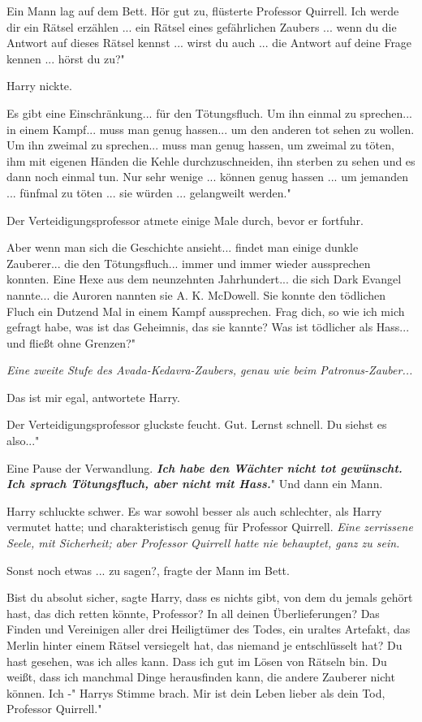 Ein Mann lag auf dem Bett. \glqq{}Hör gut zu\grqq{}, flüsterte Professor
Quirrell. \glqq{}Ich werde dir ein Rätsel erzählen ... ein Rätsel eines
gefährlichen Zaubers ... wenn du die Antwort auf dieses Rätsel kennst ... wirst
du auch ... die Antwort auf deine Frage kennen ... hörst du zu?"

Harry nickte.

\glqq{}Es gibt eine Einschränkung... für den Tötungsfluch. Um ihn einmal zu
sprechen... in einem Kampf... muss man genug hassen... um den anderen tot sehen
zu wollen. Um ihn zweimal zu sprechen... muss man genug hassen, um zweimal zu
töten, ihm mit eigenen Händen die Kehle durchzuschneiden, ihn sterben zu sehen
und es dann noch einmal tun. Nur sehr wenige ... können genug hassen ... um
jemanden ... fünfmal zu töten ... sie würden ... gelangweilt werden."

Der Verteidigungsprofessor atmete einige Male durch, bevor er fortfuhr.

\glqq{}Aber wenn man sich die Geschichte ansieht... findet man einige dunkle
Zauberer... die den Tötungsfluch... immer und immer wieder aussprechen konnten.
Eine Hexe aus dem neunzehnten Jahrhundert... die sich Dark Evangel nannte... die
Auroren nannten sie A. K. McDowell. Sie konnte den tödlichen Fluch ein Dutzend
Mal in einem Kampf aussprechen. Frag dich, so wie ich mich gefragt habe, was ist
das Geheimnis, das sie kannte? Was ist tödlicher als Hass... und fließt ohne
Grenzen?"

\emph{Eine zweite Stufe des Avada-Kedavra-Zaubers, genau wie beim
Patronus-Zauber...}

\glqq{}Das ist mir egal\grqq{}, antwortete Harry.

Der Verteidigungsprofessor gluckste feucht. \glqq{}Gut. Lernst schnell. Du siehst
es also..."

Eine Pause der Verwandlung. \glqq{}\textbf{\emph{Ich habe den Wächter nicht tot
gewünscht. Ich sprach Tötungsfluch, aber nicht mit Hass.}}" Und dann ein Mann.

Harry schluckte schwer. Es war sowohl besser als auch schlechter, als Harry
vermutet hatte; und charakteristisch genug für Professor Quirrell. \emph{Eine
zerrissene Seele, mit Sicherheit; aber Professor Quirrell hatte nie behauptet,
ganz zu sein.}

\glqq{}Sonst noch etwas ... zu sagen?\grqq{}, fragte der Mann im Bett.

\glqq{}Bist du absolut sicher\grqq{}, sagte Harry, \glqq{}dass es nichts gibt, von
dem du jemals gehört hast, das dich retten könnte, Professor? In all deinen
Überlieferungen? Das Finden und Vereinigen aller drei Heiligtümer des Todes, ein
uraltes Artefakt, das Merlin hinter einem Rätsel versiegelt hat, das niemand je
entschlüsselt hat? Du hast gesehen, was ich alles kann. Dass ich gut im Lösen
von Rätseln bin. Du weißt, dass ich manchmal Dinge herausfinden kann, die andere
Zauberer nicht können. Ich -" Harrys Stimme brach. \glqq{}Mir ist dein Leben
lieber als dein Tod, Professor Quirrell."


